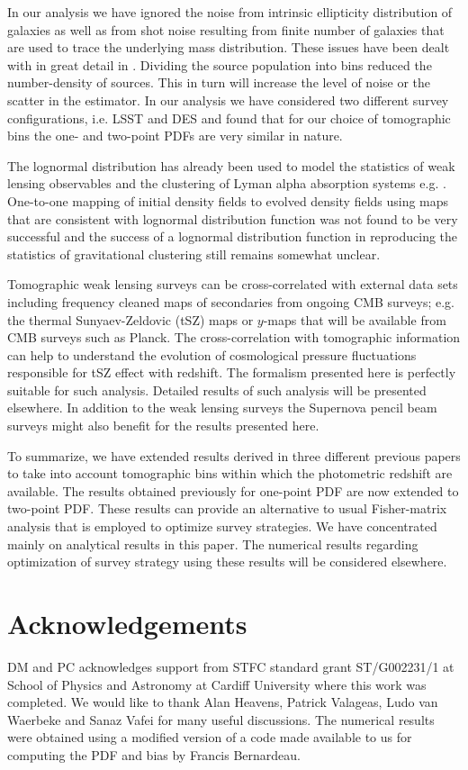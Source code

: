 \documentclass[usenatbib]{mn2e}
\begin{document}
In our analysis we have ignored the noise from intrinsic ellipticity distribution of galaxies
as well as from shot noise resulting from finite number of galaxies that are used
to trace the underlying mass distribution. These issues have been dealt with 
in great detail in \cite{MuCo03,VaBaMu04}. Dividing the source population into bins reduced the
number-density of sources. This in turn will increase the level of noise or the
scatter in the estimator. In our analysis we have considered two different survey configurations,
i.e. LSST and DES and found that for our choice of tomographic bins the one- and two-point 
PDFs are very similar in nature. 
%

The lognormal distribution has already been used to model 
the statistics of weak lensing observables \citep{Mu00,TTHF02} and the clustering of Lyman alpha
absorption systems e.g. \citep{BD97}. One-to-one mapping of initial density fields to
evolved density fields using maps that are consistent with lognormal distribution
function was not found to be very successful and the success of a lognormal distribution
function in reproducing the statistics of gravitational clustering still remains 
somewhat unclear. 
%

Tomographic weak lensing surveys can be cross-correlated with external data sets
including frequency cleaned maps of secondaries from  ongoing CMB surveys;
e.g. the thermal Sunyaev-Zeldovic (tSZ) maps or $y$-maps that will be available from
CMB surveys such as Planck. The cross-correlation with tomographic
information can help to understand the evolution of cosmological pressure fluctuations
responsible for tSZ effect with redshift. The formalism presented here is 
perfectly suitable for such analysis. Detailed results of such analysis will be presented
elsewhere. In addition to the weak lensing surveys the Supernova pencil beam surveys 
might also benefit for the results presented here.
%

To summarize, we have extended results derived in three different previous papers
\citep{MuCo03,VaMuBa05,VaBaMu04} to take into
account tomographic bins within which the photometric redshift are available. The results
obtained previously for one-point PDF are now extended to two-point PDF.
These results can provide an alternative to usual Fisher-matrix analysis 
that is employed to optimize survey strategies. We have concentrated mainly on 
analytical results in this paper. The numerical results regarding optimization of survey strategy using 
these results will be considered elsewhere.

\section{Acknowledgements}
\label{acknow}
DM and PC acknowledges support
from STFC standard grant ST/G002231/1 at School of Physics and
Astronomy at Cardiff University where this work was completed. 
We would like to thank Alan Heavens, Patrick Valageas, Ludo van Waerbeke and Sanaz Vafei for many useful discussions.
The numerical results were obtained using a modified version of a code made available to us
for computing the PDF and bias by Francis Bernardeau. 
%

\appendix
\end{document}
